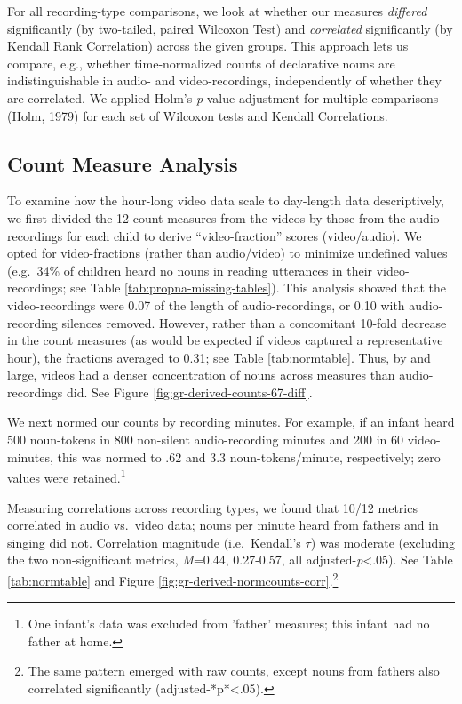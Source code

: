\documentclass[man]{apa6}
\theoremstyle{definition}
\theoremstyle{definition}
\theoremstyle{definition}
\theoremstyle{remark}
\begin{document}
For all recording-type comparisons, we look at whether our measures
\emph{differed} significantly (by two-tailed, paired Wilcoxon Test) and
\emph{correlated} significantly (by Kendall Rank Correlation) across the
given groups. This approach lets us compare, e.g., whether
time-normalized counts of declarative nouns are indistinguishable in
audio- and video-recordings, independently of whether they are
correlated. We applied Holm's \emph{p}-value adjustment for multiple
comparisons (Holm, 1979) for each set of Wilcoxon tests and Kendall
Correlations.

\subsection{Count Measure Analysis}\label{count-measure-analysis}

To examine how the hour-long video data scale to day-length data
descriptively, we first divided the 12 count measures from the videos by
those from the audio-recordings for each child to derive
\enquote{video-fraction} scores (video/audio). We opted for
video-fractions (rather than audio/video) to minimize undefined values
(e.g.~34\% of children heard no nouns in reading utterances in their
video-recordings; see Table \ref{tab:propna-missing-tables}). This
analysis showed that the video-recordings were 0.07 of the length of
audio-recordings, or 0.10 with audio-recording silences removed.
However, rather than a concomitant 10-fold decrease in the count
measures (as would be expected if videos captured a representative
hour), the fractions averaged to 0.31; see Table \ref{tab:normtable}.
Thus, by and large, videos had a denser concentration of nouns across
measures than audio-recordings did. See Figure
\ref{fig:gr-derived-counts-67-diff}.

We next normed our counts by recording minutes. For example, if an
infant heard 500 noun-tokens in 800 non-silent audio-recording minutes
and 200 in 60 video-minutes, this was normed to .62 and 3.3
noun-tokens/minute, respectively; zero values were
retained.\footnote{One infant's data was excluded from 'father' measures; this infant had no father at home.}

Measuring correlations across recording types, we found that 10/12
metrics correlated in audio vs.~video data; nouns per minute heard from
fathers and in singing did not. Correlation magnitude (i.e.~Kendall's
\(\tau\)) was moderate (excluding the two non-significant metrics,
\emph{M}=0.44, 0.27-0.57, all adjusted-\emph{p}\textless{}.05). See
Table \ref{tab:normtable} and Figure
\ref{fig:gr-derived-normcounts-corr}.\footnote{The same pattern emerged with raw counts, except nouns from fathers also correlated significantly (adjusted-*p*<.05).}
\end{document}

